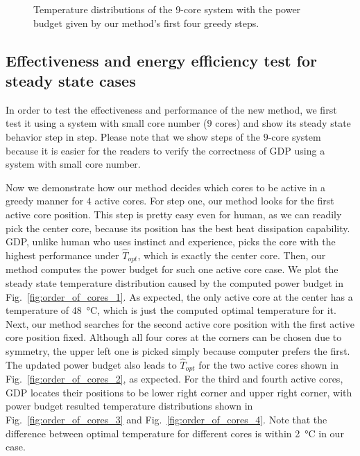 \begin{figure}
{  }
  \hfill
  \caption{Temperature distributions of the 9-core system with the power budget given by our method's first four greedy steps.}
  \label{fig:order_of_cores}
\end{figure}

\subsection{Effectiveness and energy efficiency test for steady state cases}
In order to test the effectiveness and performance of the new method, we first test it
using a system with small core number ($9$ cores) and show its steady state
behavior step in step. Please note that we show steps of the $9$-core system
because it is easier for the readers to verify the correctness of GDP using
a system with small core number.

Now we demonstrate how our method decides which cores to be active in a
greedy manner for $4$ active cores. For step one, our method looks for the first
active core position. This step is pretty easy even for human, as we
can readily pick the center core, because its position has the best
heat dissipation capability. GDP, unlike human who uses instinct and
experience, picks the core with the highest performance under $\hat{T}_{opt}$, which is exactly the center core. 
Then, our method computes the power
budget for such one active core case. We plot the steady state temperature
distribution caused by the computed power budget in
Fig.~\ref{fig:order_of_cores_1}. As expected, the only active core at
the center has a temperature of \SI{48}{\degreeCelsius}, which is just
the computed optimal temperature for it. Next, our method searches for the
second active core position with the first active core position
fixed. Although all four cores at the corners can be chosen due to
symmetry, the upper left one is picked simply because computer prefers
the first. The updated power budget also leads to
$\hat{T}_{opt}$ for the two active cores shown in Fig.~\ref{fig:order_of_cores_2}, as expected. For the
third and fourth active cores, GDP locates their positions to be 
lower right corner and upper right corner, with power budget
resulted temperature distributions shown in
Fig.~\ref{fig:order_of_cores_3} and Fig.~\ref{fig:order_of_cores_4}. Note that the difference between optimal temperature for different cores is within \SI{2}{\degreeCelsius} in our case.




